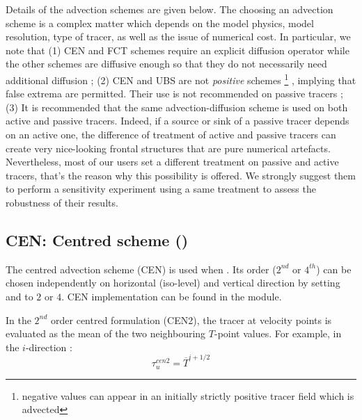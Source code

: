 \documentclass[../tex_main/NEMO_manual]{subfiles}
\begin{document}
Details of the advection schemes are given below. The choosing an advection scheme 
is a complex matter which depends on the model physics, model resolution, 
type of tracer, as well as the issue of numerical cost. In particular, we note that
(1) CEN and FCT schemes require an explicit diffusion operator 
while the other schemes are diffusive enough so that they do not necessarily need additional diffusion ; 
(2) CEN and UBS are not \textit{positive} schemes
\footnote{negative values can appear in an initially strictly positive tracer field 
which is advected}
, implying that false extrema are permitted. Their use is not recommended on passive tracers ; 
(3) It is recommended that the same advection-diffusion scheme is 
used on both active and passive tracers. Indeed, if a source or sink of a 
passive tracer depends on an active one, the difference of treatment of 
active and passive tracers can create very nice-looking frontal structures 
that are pure numerical artefacts. Nevertheless, most of our users set a different 
treatment on passive and active tracers, that's the reason why this possibility 
is offered. We strongly suggest them to perform a sensitivity experiment 
using a same treatment to assess the robustness of their results.

\subsection{CEN: Centred scheme (\protect{})}
\label{subsec:TRA_adv_cen}


The centred advection scheme (CEN) is used when . 
Its order ($2^{nd}$ or $4^{th}$) can be chosen independently on horizontal (iso-level) 
and vertical direction by setting  and  to $2$ or $4$. 
CEN implementation can be found in the  module.

In the $2^{nd}$ order centred formulation (CEN2), the tracer at velocity points 
is evaluated as the mean of the two neighbouring $T$-point values. 
For example, in the $i$-direction :
\begin{equation} \label{eq:tra_adv_cen2}
\tau _u^{cen2} =\overline T ^{i+1/2}
\end{equation}
\end{document}
